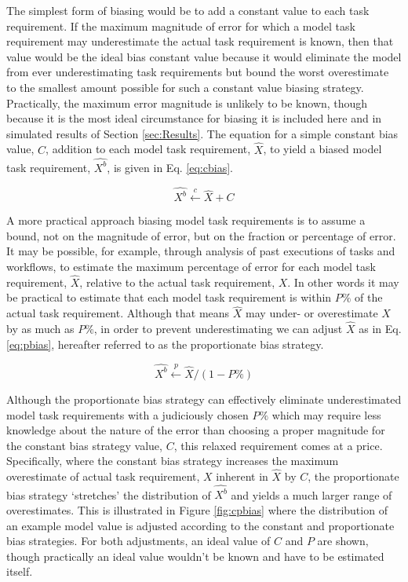 \documentclass[10pt]{csce}
\begin{document}
The simplest form of biasing would be to add a constant value to each
task requirement.  If the maximum magnitude of error for which a model
task requirement may underestimate the actual task requirement is known,
then that value would be the ideal bias constant value because it would
eliminate the model from ever underestimating task requirements but
bound the worst overestimate to the smallest amount possible for such a
constant value biasing strategy.  Practically, the maximum error magnitude
is unlikely to be known, though because it is the most ideal circumstance
for biasing it is included here and in simulated results of Section
\ref{sec:Results}.  The equation for a simple constant bias value, $C$,
addition to each model task requirement, $\hat{X}$, to yield a biased
model task requirement, $\hat{X^b}$, is given in Eq.
\ref{eq:cbias}.

\begin{equation}
\hat{X^b} \xleftarrow{c} \hat{X} + C
\label{eq:cbias}
\end{equation}

A more practical approach biasing model task requirements is to assume a bound,
not on the magnitude of error, but on the fraction or percentage of error.  It
may be possible, for example, through analysis of past executions of tasks and
workflows, to estimate the maximum percentage of error for each model task
requirement, $\hat{X}$, relative to the actual task requirement, $X$.  In other
words it may be practical to estimate that each model task requirement is
within $P\%$ of the actual task requirement.  Although that means $\hat{X}$
may under- or overestimate $X$ by as much as $P\%$, in order to prevent
underestimating we can adjust $\hat{X}$ as in Eq. \ref{eq:pbias}, hereafter
referred to as the proportionate bias strategy.

\begin{equation}
\hat{X^b} \xleftarrow{p} \hat{X} / (1 - P\%)
\label{eq:pbias}
\end{equation}

Although the proportionate bias strategy can effectively eliminate
underestimated model task requirements with a judiciously chosen $P\%$
which may require less knowledge about the nature of the error than choosing
a proper magnitude for the constant bias strategy value, $C$, this relaxed
requirement comes at a price.  Specifically, where the constant bias
strategy increases the maximum overestimate of actual task requirement, $X$
inherent in $\hat{X}$ by $C$, the proportionate bias strategy `stretches'
the distribution of $\hat{X^b}$ and yields a much larger range of
overestimates.  This is illustrated in Figure \ref{fig:cpbias} where the
distribution of an example model value is adjusted according to the constant
and proportionate bias strategies.  For both adjustments, an ideal value of
$C$ and $P$ are shown, though practically an ideal value wouldn't be known
and have to be estimated itself.
\end{document}
